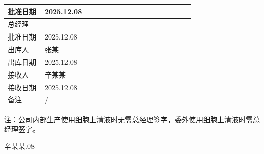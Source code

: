 \documentclass[UTF8,10pt,a4paper,fontset=fandol]{ctexart}
\newcommand{\fieldvalue}[1]{#1}
\newcommand{\handwritten}[1]{#1}
\begin{document}
\begin{tabular}{|p{0.19\linewidth}|p{0.77\linewidth}|}
\hline
批准日期 &
\fieldvalue{\handwritten{2025.12.08}}\\
\hline
总经理 &
\\
\hline
批准日期 &
\fieldvalue{\handwritten{2025.12.08}}\\
\hline
出库人 &
\fieldvalue{\handwritten{张某}}\\
\hline
出库日期 &
\fieldvalue{\handwritten{2025.12.08}}\\
\hline
接收人 &
\fieldvalue{\handwritten{辛某某}}\\
\hline
接收日期 &
\fieldvalue{\handwritten{2025.12.08}}\\
\hline
备注 &
\fieldvalue{\handwritten{/}}\\
\hline
\end{tabular}

\smallskip

注：公司内部生产使用细胞上清液时无需总经理签字，委外使用细胞上清液时需总经理签字。

\vspace{0.5em}

\handwritten{辛某某.08}
\end{document}
